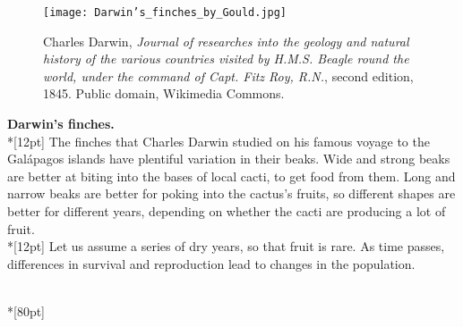 \documentclass{exam}
\begin{document}
\question
\begin{minipage}{\textwidth}
\begin{wrapfigure}[21]{r}{0.45\textwidth}
\texttt{[image: Darwin's\_finches\_by\_Gould.jpg]}
\caption{\footnotesize Charles Darwin, \emph{Journal of researches into the geology and natural history of the various countries visited by H.M.S. Beagle round the world, under the command of Capt. Fitz Roy, R.N.}, second edition, 1845. Public domain, Wikimedia Commons.}
\end{wrapfigure}

\textbf{Darwin's finches.}
\\*[12pt]
The finches that Charles Darwin studied on his famous voyage to the Gal\'apagos islands have plentiful variation in their beaks. Wide and strong beaks are better at biting into the bases of local cacti, to get food from them. Long and narrow beaks are better for poking into the cactus's fruits, so different shapes are better for different years, depending on whether the cacti are producing a lot of fruit.
\\*[12pt]
Let us assume a series of dry years, so that fruit is rare.  As time passes, differences in survival and reproduction lead to changes in the population.
\end{minipage}
\\*[80pt]
\question
\end{document}
